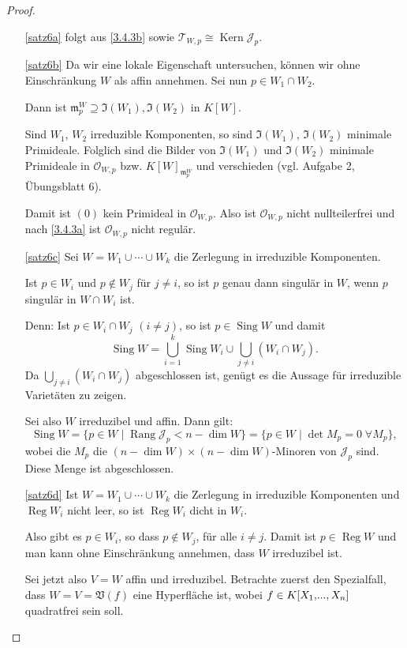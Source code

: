 \documentclass[a4paper,12pt,index=toc]{scrbook}
\theoremstyle{keinenummern} %
\def\V{\mathfrak{V}}
\def\I{\mathfrak{I}}
\def\O{\mathcal{O}}
\newcommand{\J}{\mathcal{J}}
\def\T{\mathcal{T}}
\def\m{\mathfrak{m}}
\newcommand{\Kern}{\operatorname{Kern}}
\newcommand{\Rang}{\operatorname{Rang}}
\newcommand{\Sing}{\operatorname{Sing}}
\newcommand{\Reg}{\operatorname{Reg}}
\renewcommand{\dotsc}{\ensuremath{\!...}}
\newcommand{\polyx}[1][n]{\ensuremath%
  [X_{1},\dotsc,X_{#1}]}
\begin{document}
\begin{proof}
  \begin{enumerate}
  \item[\ref{satz6a}] folgt aus \cref{3.4.3b} sowie $\T_{W,p}\cong \Kern \J_p$.
  \item[\ref{satz6b}] Da wir eine lokale Eigenschaft untersuchen, können wir ohne Einschränkung $W$ als affin annehmen. Sei nun $p\in W_1\cap W_2$.

  Dann ist $\m_p^W\supseteq \I(W_1),\I(W_2)$ in $K[W]$.

  Sind $W_1$, $W_2$ irreduzible Komponenten, so sind $\I(W_1)$, $\I(W_2)$ minimale Primideale. Folglich sind die Bilder von $\I(W_1)$ und $\I(W_2)$ minimale Primideale in $\O_{W,p}$ bzw. $K[W]_{\m_p^W}$ und verschieden (vgl. Aufgabe 2, Übungsblatt 6).

  Damit ist $(0)$ kein Primideal in $\O_{W,p}$. Also ist $\O_{W,p}$ nicht nullteilerfrei und nach \cref{3.4.3a} ist $\O_{W,p}$ nicht regulär.
  \item[\ref{satz6c}] Sei $W=W_1\cup \dotsm \cup W_k$ die Zerlegung in irreduzible Komponenten.

  Ist $p\in W_i$ und $p\notin W_j$ für $j\neq i$, so ist $p$ genau dann singulär in $W$, wenn $p$ singulär in $W\cap W_i$ ist.

 Denn: Ist $p\in W_i\cap W_j$ $(i\neq j)$, so ist $p \in \Sing W$ und damit
\begin{equation*}\Sing W=\bigcup\limits_{i=1}^{k} \Sing W_i \cup \bigcup\limits_{j\neq i}^{}(W_i\cap W_j).\end{equation*}
Da $  \bigcup\limits_{j\neq i}^{}(W_i\cap W_j)$ abgeschlossen ist, genügt es die Aussage für irreduzible Varietäten zu zeigen. 

Sei also $W$ irreduzibel und affin. Dann gilt:
\begin{equation*}\Sing W=\{p\in W \mid \Rang \J_p < n-\dim W\}=\{p\in W \mid \det M_p=0\;\forall M_{p}\},\end{equation*}
wobei die $M_{p}$ die $(n-\dim W)\times (n-\dim W)$-Minoren von $\J_p$ sind. Diese Menge ist abgeschlossen.
  \item[\ref{satz6d}] Ist $W=W_1\cup \dotsm \cup W_k$ die Zerlegung in irreduzible Komponenten und $\Reg W_i$ nicht leer, so ist $\Reg W_i$ dicht in $W_i$.

Also gibt es $p\in W_i$, so dass $p\notin W_j$, für alle $i\neq j$. Damit ist $p\in \Reg W$ und man kann ohne Einschränkung annehmen, dass $W$ irreduzibel ist.

Sei jetzt also $V=W$ affin und irreduzibel. Betrachte zuerst den Spezialfall, dass $W=V=\V(f)$ eine Hyperfläche ist, wobei $f\in K\polyx$ quadratfrei sein soll.


\end{enumerate}
\end{proof}
\end{document}
